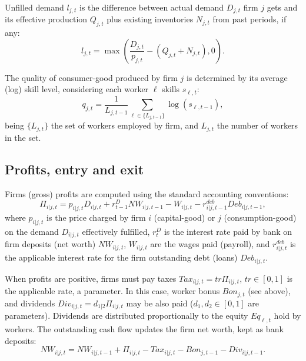 \documentclass[a4paper,11pt]{article}
\begin{document}
\begin{appendices}
Unfilled demand $l_{j,t}$ is the difference between actual demand $D_{j,t}$ firm $j$ gets and its effective production $Q_{j,t}$ plus existing inventories $N_{j,t}$ from past periods, if any:
\begin{equation}
	l_{j,t} = \max \left( \frac{ D_{j,t} }{ p_{j,t} } - \left( Q_{j,t} + N_{j,t} \right), 0 \right).
\end{equation}

The quality of consumer-good produced by firm $j$ is determined by its average (log) skill level, considering each worker $\ell$ skills $s_{\ell,t}$:
\begin{equation}
	q_{j,t} = \frac{1}{L_{j,t-1}} \sum_{ \ell \in \{L_{j,t-1}\} } \log \left( s_{\ell,t-1} \right),
	\label{eqquality}
\end{equation}
being $\{L_{j,t}\}$ the set of workers employed by firm, and $L_{j,t}$ the number of workers in the set.


\subsection*{Profits, entry and exit}

Firms (gross) profits are computed using the standard accounting conventions:
\begin{equation}
	\Pi_{i|j,t} = p_{i|j,t} D_{i|j,t} + r_{t-1}^D NW_{i|j,t-1} - W_{i|j,t} - r_{i|j,t-1}^{deb} Deb_{i|j,t-1},
\end{equation}
where $p_{i|j,t}$ is the price charged by firm $i$ (capital-good) or $j$ (consumption-good) on the demand $D_{i|j,t}$ effectively fulfilled, $r_{t}^D$ is the interest rate paid by bank on firm deposits (net worth) $NW_{i|j,t}$, $W_{i|j,t}$ are the wages paid (payroll), and $r_{i|j,t}^{deb}$ is the applicable interest rate for the firm outstanding debt (loans) $Deb_{i|j,t}$.

When profits are positive, firms must pay taxes $Tax_{i|j,t} = tr \Pi_{i|j,t}$, $tr \in [0, 1]$ is the applicable rate, a parameter. In this case, worker bonus $Bon_{j,t}$ (see above), and dividends $Div_{i|j,t} = d_{1|2} \Pi_{i|j,t}$ may be also paid ($d_1, d_2 \in [0, 1]$ are parameters). Dividends are distributed proportionally to the equity $Eq_{\ell,t}$ hold by workers. The outstanding cash flow updates the firm net worth, kept as bank deposits:
\begin{equation}
	NW_{i|j,t} = NW_{i|j,t-1} + \Pi_{i|j,t} - Tax_{i|j,t} - Bon_{j,t-1} - Div_{i|j,t-1}.
\end{equation}


\end{appendices}
\end{document}
